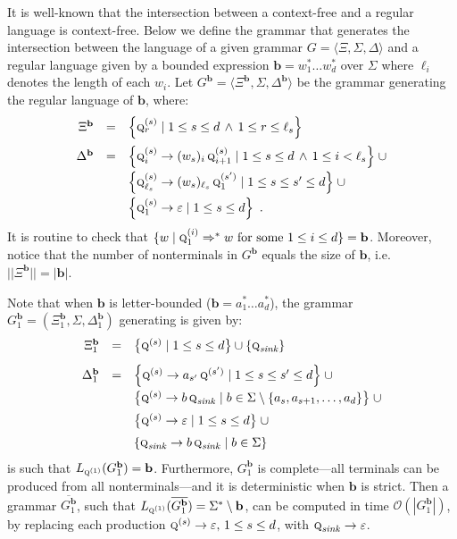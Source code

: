 \documentclass[final]{llncs}
\def\set#1{{\left\{ #1 \right\}}}
\def\tuple#1{{\langle #1 \rangle}}
\def\card#1{{|\!|{#1}|\!|}}
\def\len#1{{\vert{#1}\vert}}
\def\prod{\Delta}
\def\pat{{\mathbf{b}}}
\def\Vars{\ensuremath{\Xi}}
\begin{document}
It is well-known that the intersection between a context-free and a regular
language is context-free. Below we define the grammar that generates the
intersection between the language of a given grammar $G = \tuple{ \Vars,
\Sigma, \prod }$ and a regular language given by a bounded expression
$\pat=w_1^* \dots w_d^*$ over \(\Sigma\) where \(\ell_i\) denotes the
length of each \(w_i\). Let $G^{\pat} = \tuple{\Vars^{\pat},\Sigma,\prod^{\pat}}$ be the
grammar generating the regular language of $\pat$, where:
\[\begin{array}{rcl}
\Vars^{\pat} & = &  \set{\textsc{q}^{(s)}_{r} \mid 1\leq s\leq d \, \land \,  1\leq r\leq \ell_s} \\[0.3cm]
\prod^{\pat} & = & \set{\textsc{q}^{(s)}_{i}\rightarrow (w_s)_{i}\, \textsc{q}^{(s)}_{i+1}\mid 1 \leq  s \leq  d \, \land \, 1 \leq  i < \ell_s} \; \cup\\[0.2cm]
& & \set{\textsc{q}^{(s)}_{\ell_s}\rightarrow (w_s)_{\ell_s}\, \textsc{q}^{(s')}_{1}\mid 1 \leq  s \leq  s' \leq  d} \; \cup\\[0.2cm]
& & \set{\textsc{q}_1^{(s)}\rightarrow \varepsilon \mid 1 \leq  s \leq  d}\enspace .
\end{array}\]
It is routine to check that \(\{w\mid \textsc{q}_1^{(i)}\Rightarrow^*
w \text{ for some } 1\leq i\leq d \}=\pat\). Moreover, notice that
the number of nonterminals in $G^\pat$ equals the size of $\pat$,
i.e.\ $\card{\Vars^\pat} = \len{\pat}$.

\begin{remark}\label{rem:letter-bounded-complement}
Note that when \(\pat\) is letter-bounded (\(\pat = a_1^* \ldots a_d^*\)), the grammar \(G^{\pat}_1 =
(\Vars^{\pat}_1,\Sigma,\prod^{\pat}_1) \) generating is given by:
\[\begin{array}{rcl}
\Vars_1^{\pat} & = & \set{\textsc{q}^{(s)} \mid 1\leq s\leq d} \cup \set{\textsc{q}_{\mathit{sink}}} \\[0.3cm]
\prod_1^{\pat} & = & \set{\textsc{q}^{(s)} \rightarrow a_{s'} \, \textsc{q}^{(s')} \mid 1 \leq  s \leq s' \leq  d } \; \cup\\[0.2cm]
& & \set{\textsc{q}^{(s)} \rightarrow b\, \textsc{q}_{\mathit{sink}} \mid b \in \Sigma \setminus \{a_s, a_{s+1}, \ldots, a_d\} }\; \cup\\[0.2cm]
& & \set{\textsc{q}^{(s)}\rightarrow \varepsilon \mid 1 \leq  s \leq  d}\; \cup\\[0.2cm]
& & \set{\textsc{q}_{\mathit{sink}} \rightarrow b\, \textsc{q}_{\mathit{sink}} \mid b \in \Sigma }
\end{array}\]
is such that \(L_{\textsc{q}^{(1)}}(G^{\pat}_1) = \pat\).
Furthermore, \(G^{\pat}_1\) is complete---all terminals can be
produced from all nonterminals---and it is deterministic when \(\pat\) is
strict. Then a grammar \(\overline{G^{\pat}_1}\), such that
\(L_{\textsc{q}^{(1)}}(\overline{G^{\pat}_1}) = \Sigma^* \setminus
\pat\), can be computed in time \(\mathcal{O}(|G_1^{\pat}|)\), by
replacing each production \( \textsc{q}^{(s)}\rightarrow \varepsilon,\,
1 \leq s \leq d\), with \(\textsc{q}_{\mathit{sink}} \rightarrow
\varepsilon\).
\end{remark}
\end{document}
